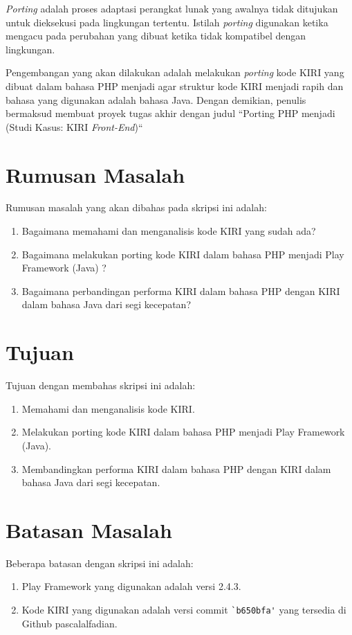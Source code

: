 \textit{Porting} adalah proses adaptasi perangkat lunak yang awalnya tidak ditujukan untuk dieksekusi pada lingkungan tertentu. Istilah \textit{porting} digunakan ketika mengacu pada perubahan yang dibuat ketika tidak kompatibel dengan lingkungan.

Pengembangan yang akan dilakukan adalah melakukan \textit{porting} kode KIRI yang dibuat dalam bahasa PHP menjadi \play agar struktur kode KIRI menjadi rapih dan bahasa yang digunakan adalah bahasa Java. Dengan demikian, penulis bermaksud membuat proyek tugas akhir dengan judul ``Porting PHP menjadi \play (Studi Kasus: KIRI \textit{Front-End})``

\section{Rumusan Masalah}
\label{rumusanMasalah}
Rumusan masalah yang akan dibahas pada skripsi ini adalah:
\begin{enumerate}
	\item Bagaimana memahami dan menganalisis kode KIRI yang sudah ada?
	\item Bagaimana melakukan porting kode KIRI dalam bahasa PHP menjadi Play Framework (Java) ?
	\item Bagaimana perbandingan performa KIRI dalam bahasa PHP dengan KIRI dalam bahasa Java dari segi kecepatan?
\end{enumerate}

\section{Tujuan}
\label{sec:tujuan}
Tujuan dengan membahas skripsi ini adalah:
\begin{enumerate}
	\item Memahami dan menganalisis kode KIRI.
	\item Melakukan porting kode KIRI dalam bahasa PHP menjadi Play Framework (Java).
	\item Membandingkan performa KIRI dalam bahasa PHP dengan KIRI dalam bahasa Java dari segi kecepatan.
\end{enumerate}

\section{Batasan Masalah}
\label{sec:batasanMasalah}
Beberapa batasan dengan skripsi ini adalah:
\begin{enumerate}
	\item Play Framework yang digunakan adalah versi 2.4.3.
	\item Kode KIRI yang digunakan adalah versi commit \verb!`b650bfa'! yang tersedia di Github pascalalfadian\cite{githubkiri}.
\end{enumerate}

